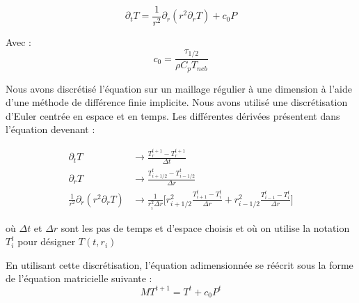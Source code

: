 \documentclass[10pt,a4paper]{article}
\numberwithin{equation}{section}
\begin{document}
\begin{equation}
 \partial_{t} T =  \frac{1}{r^2} \partial_{r} ( {r}^2 \partial_{r} T)  + c_0 P 
\end{equation}

Avec :
\begin{equation}
 c_0 = \frac{\tau_{1/2}}{\rho C_p T_{neb}}
\end{equation}


Nous avons discrétisé l'équation sur un maillage régulier à une dimension à l'aide d'une méthode de différence finie implicite. Nous avons utilisé une discrétisation d'Euler centrée en espace et en temps. Les différentes dérivées présentent dans l'équation devenant :

\begin{align}
\partial_t T &\rightarrow  \frac{T^{t+1}_r - T^{t+1}_r}{\Delta t}\\
\partial_r T &\rightarrow  \frac{T^t_{i+1/2} - T^{t}_{i-1/2}}{\Delta r} \\
\frac{1}{r^2}\partial_r (r^2 \partial_r T ) &\rightarrow \frac{1}{r^2_i \Delta r}\Big [ r^2_{i+1/2}\frac{T^t_{i+1} - T^{t}_{i}}{\Delta r} + r^2_{i-1/2}\frac{T^t_{i-1} - T^{t}_{i}}{\Delta r} \Big]
\end{align}

où $\Delta t$ et $\Delta r$ sont les pas de temps et d'espace choisis et où on utilise la notation $T^{t}_i$ pour désigner $T(t,r_i)$ 

En utilisant cette discrétisation, l'équation adimensionnée se réécrit sous la forme de l'équation matricielle suivante :
\begin{equation}
MT^{t+1} = T^t + c_0 P^{t}
\end{equation}
\end{document}
